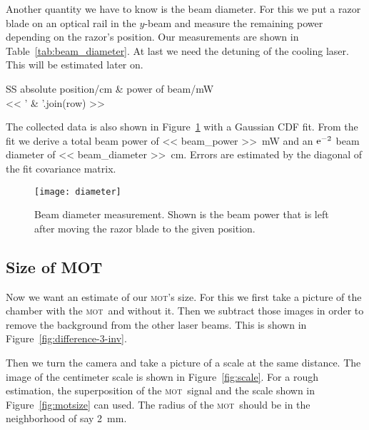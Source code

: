 \documentclass[11pt, english, fleqn, DIV=15, headinclude, BCOR=2cm]{scrreprt}
\newcommand\mot{\textsc{mot}}
\begin{document}
Another quantity we have to know is the beam diameter. For this we put a razor
blade on an optical rail in the $y$-beam and measure the remaining power
depending on the razor's position. Our measurements are shown in
Table~\ref{tab:beam_diameter}. At last we need the detuning of the cooling
laser. This will be estimated later on.

\begin{table}
    \centering
    \begin{tabular}{SS}
        \toprule
        {absolute position/\si{\centi\meter}}
        & {power of beam/\si{\milli\watt}} \\
        \midrule
        << ' & '.join(row) >> \\
        \bottomrule
    \end{tabular}
    \caption{%
        Measurement to estimate the beam diameter.
    }
    \label{tab:beam_diameter}
\end{table}

The collected data is also shown in Figure~\ref{fig:diameter} with a Gaussian
CDF fit. From the fit we derive a total beam power of \SI{<< beam_power
>>}{\milli\watt} and an $\mathrm e^{-2}$ beam diameter of \SI{<< beam_diameter
>>}{\centi\meter}. Errors are estimated by the diagonal of the fit covariance
matrix.

\begin{figure}
    \centering
    \texttt{[image: diameter]}
    \caption{%
        Beam diameter measurement. Shown is the beam power that is left after
        moving the razor blade to the given position.
    }
    \label{fig:diameter}
\end{figure}


\subsection{Size of MOT}

Now we want an estimate of our \mot's size. For this we first take a picture of
the chamber with the \mot\ and without it. Then we subtract those images in
order to remove the background from the other laser beams. This is shown in
Figure~\ref{fig:difference-3-inv}.

Then we turn the camera and take a picture of a scale at the same distance. The
image of the centimeter scale is shown in Figure~\ref{fig:scale}. For a rough
estimation, the superposition of the \mot\ signal and the scale shown in
Figure~\ref{fig:motsize} can used. The radius of the \mot\ should be in the
neighborhood of say \SI{2}{\milli\meter}.
\end{document}
